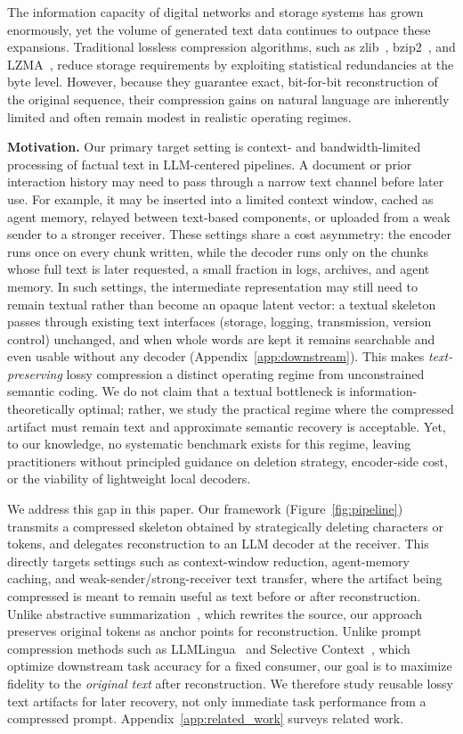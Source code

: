 \documentclass[11pt]{article}
\begin{document}
The information capacity of digital networks and storage systems has grown enormously, yet the volume of generated text data continues to outpace these expansions. Traditional lossless compression algorithms, such as zlib~\citep{zlib}, bzip2~\citep{bz2}, and LZMA~\citep{lzma}, reduce storage requirements by exploiting statistical redundancies at the byte level. However, because they guarantee exact, bit-for-bit reconstruction of the original sequence, their compression gains on natural language are inherently limited and often remain modest in realistic operating regimes.

\textbf{Motivation.} Our primary target setting is context- and bandwidth-limited processing of factual text in LLM-centered pipelines. A document or prior interaction history may need to pass through a narrow text channel before later use. For example, it may be inserted into a limited context window, cached as agent memory, relayed between text-based components, or uploaded from a weak sender to a stronger receiver. These settings share a cost asymmetry: the encoder runs once on every chunk written, while the decoder runs only on the chunks whose full text is later requested, a small fraction in logs, archives, and agent memory. In such settings, the intermediate representation may still need to remain textual rather than become an opaque latent vector: a textual skeleton passes through existing text interfaces (storage, logging, transmission, version control) unchanged, and when whole words are kept it remains searchable and even usable without any decoder (Appendix~\ref{app:downstream}). This makes \emph{text-preserving} lossy compression a distinct operating regime from unconstrained semantic coding. We do not claim that a textual bottleneck is information-theoretically optimal; rather, we study the practical regime where the compressed artifact must remain text and approximate semantic recovery is acceptable. Yet, to our knowledge, no systematic benchmark exists for this regime, leaving practitioners without principled guidance on deletion strategy, encoder-side cost, or the viability of lightweight local decoders.

We address this gap in this paper. Our framework (Figure~\ref{fig:pipeline}) transmits a compressed skeleton obtained by strategically deleting characters or tokens, and delegates reconstruction to an LLM decoder at the receiver. This directly targets settings such as context-window reduction, agent-memory caching, and weak-sender/strong-receiver text transfer, where the artifact being compressed is meant to remain useful as text before or after reconstruction. Unlike abstractive summarization~\citep{rush2015neural,see2017get,liu2019text}, which rewrites the source, our approach preserves original tokens as anchor points for reconstruction. Unlike prompt compression methods such as LLMLingua~\citep{jiang2023llmlingua} and Selective Context~\citep{li2023compressing}, which optimize downstream task accuracy for a fixed consumer, our goal is to maximize fidelity to the \emph{original text} after reconstruction. We therefore study reusable lossy text artifacts for later recovery, not only immediate task performance from a compressed prompt. Appendix~\ref{app:related_work} surveys related work.
\end{document}
